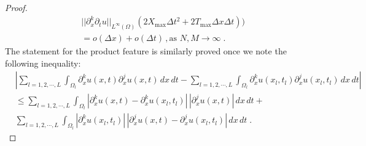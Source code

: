 \documentclass[a4paper,11pt]{article}
\begin{document}
\begin{proof}
\begin{align*}
&||\partial_x^{k}\partial_tu||_{L^\infty(\Omega)}(2X_{\max}\Delta t^2+2T_{\max}\Delta x\Delta t))\\
&=o(\Delta x)+o(\Delta t)\,,\text{as~}N,M\to\infty\;.
\end{align*}
The statement for the product feature is similarly proved once we note the following inequality:
\begin{align*}
&|\sum_{l=1,2,\cdots,L}\int_{\Omega_l}\partial_x^ku(x,t)\partial_x^ju(x,t)\,dx\,dt-\sum_{l=1,2,\cdots,L}\int_{\Omega_l}\partial_x^ku(x_l,t_l)\partial_x^ju(x_l,t_l)\,dx\,dt|\\
&\leq\sum_{l=1,2,\cdots,L}\int_{\Omega_l}|\partial_x^ku(x,t)-\partial_x^ku(x_l,t_l)|\,|\partial_x^ju(x,t)|\,dx\,dt+\\
&\sum_{l=1,2,\cdots,L}\int_{\Omega_l}|\partial_x^ku(x_l,t_l)|\,|\partial_x^ju(x,t)-\partial_x^ju(x_l,t_l)|\,dx\,dt\;.
\end{align*}
\end{proof}



\end{document}
